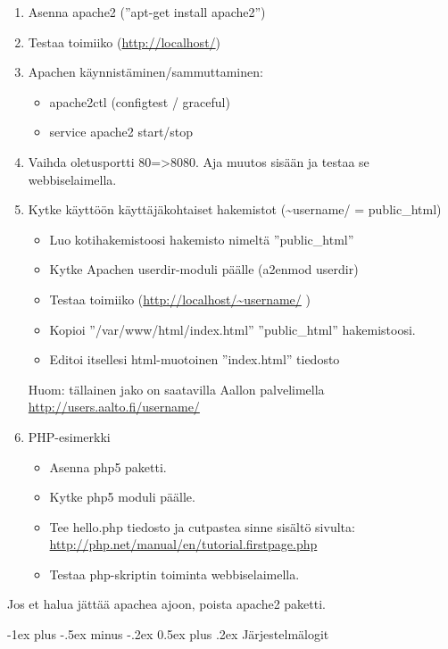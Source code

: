 \documentclass[12pt,portrait,a4]{article}
\makeatletter
\renewcommand{\section}{\@startsection{section}{1}{0mm}%
                                {-1ex plus -.5ex minus -.2ex}%
                                {0.5ex plus .2ex}%
                                {\normalfont\large\bfseries}}
\makeatother
\begin{document}
\begin{enumerate}
\item Asenna apache2 (''apt-get install apache2'')
\item Testaa toimiiko (\url{http://localhost/})
\item Apachen käynnistäminen/sammuttaminen:
	\begin{itemize}
	\item apache2ctl (configtest / graceful)
	\item service apache2 start/stop
	\end{itemize}
\item Vaihda oletusportti 80=\textgreater 8080.  Aja muutos sisään ja testaa se webbiselaimella.
\item Kytke käyttöön käyttäjäkohtaiset hakemistot (\textasciitilde username/ = public\_html)
	\begin{itemize}
	\item Luo kotihakemistoosi hakemisto nimeltä ''public\_html''
	\item Kytke Apachen userdir-moduli päälle (a2enmod userdir)
	\item Testaa toimiiko (\url{http://localhost/~username/} )
	\item Kopioi ''/var/www/html/index.html'' ''public\_html'' hakemistoosi.
	\item Editoi itsellesi html-muotoinen ''index.html'' tiedosto
	\end{itemize}

Huom: tällainen jako on saatavilla Aallon palvelimella
\url{http://users.aalto.fi/username/}


\item PHP-esimerkki
	\begin{itemize}
	\item Asenna php5 paketti.
	\item Kytke php5 moduli päälle.
	\item Tee hello.php tiedosto ja cutpastea sinne sisältö sivulta:
\url{http://php.net/manual/en/tutorial.firstpage.php}
	\item Testaa php-skriptin toiminta webbiselaimella.
	\end{itemize}
\end{enumerate}

Jos et halua jättää apachea ajoon, poista apache2 paketti.

\section{Järjestelmälogit}
\end{document}
